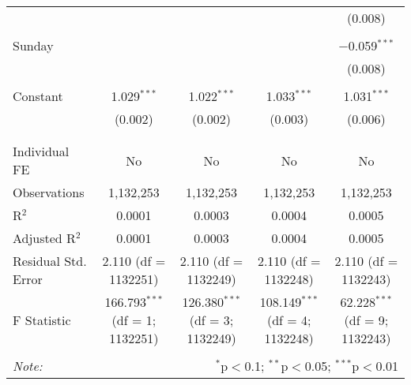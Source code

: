 \documentclass[
]{article}
\begin{document}
\begin{table}[!htbp]
{\begin{tabular}{@{\extracolsep{5pt}}lcccc}
  &  &  &  & (0.008) \\ 
  & & & & \\ 
 Sunday &  &  &  & $-$0.059$^{***}$ \\ 
  &  &  &  & (0.008) \\ 
  & & & & \\ 
 Constant & 1.029$^{***}$ & 1.022$^{***}$ & 1.033$^{***}$ & 1.031$^{***}$ \\ 
  & (0.002) & (0.002) & (0.003) & (0.006) \\ 
  & & & & \\ 
\hline \\[-1.8ex] 
Individual FE & No & No & No & No \\ 
Observations & 1,132,253 & 1,132,253 & 1,132,253 & 1,132,253 \\ 
R$^{2}$ & 0.0001 & 0.0003 & 0.0004 & 0.0005 \\ 
Adjusted R$^{2}$ & 0.0001 & 0.0003 & 0.0004 & 0.0005 \\ 
Residual Std. Error & 2.110 (df = 1132251) & 2.110 (df = 1132249) & 2.110 (df = 1132248) & 2.110 (df = 1132243) \\ 
F Statistic & 166.793$^{***}$ (df = 1; 1132251) & 126.380$^{***}$ (df = 3; 1132249) & 108.149$^{***}$ (df = 4; 1132248) & 62.228$^{***}$ (df = 9; 1132243) \\ 
\hline 
\hline \\[-1.8ex] 
\textit{Note:}  & \multicolumn{4}{r}{$^{*}$p$<$0.1; $^{**}$p$<$0.05; $^{***}$p$<$0.01} \\ 
\end{tabular}
} 
\end{table} 
\newpage
\end{document}
